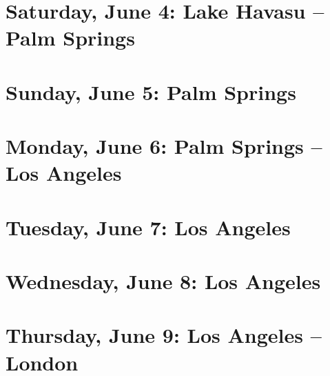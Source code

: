\documentclass[a5paper,10pt,titlepage,draft]{book}
\begin{document}
\chapter[Lake Havasu -- Palm Springs]{Saturday, June 4:  Lake Havasu -- Palm Springs}
\chapter[Palm Springs]{Sunday, June 5:  Palm Springs}
\chapter[Palm Springs -- Los Angeles]{Monday, June 6:  Palm Springs -- Los Angeles}
\chapter[Los Angeles]{Tuesday, June 7:  Los Angeles}
\chapter[Los Angeles]{Wednesday, June 8: Los Angeles}
\chapter[Los Angeles -- London]{Thursday, June 9: Los Angeles -- London}
\end{document}
